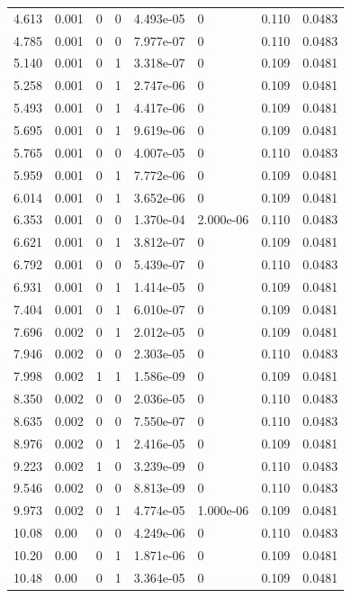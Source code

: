 \documentclass[preview]{standalone}
\begin{document}
{{\begin{tabular}{L{1.2cm}C{1.2cm} C{0.3cm}C{0.5cm} C{1.4cm}C{1.4cm} C{1.4cm}C{1.4cm}}
  4.613  &  0.001  & 0     &  0 &  4.493e-05  & 0  & 0.110 &  0.0483   \\ 
  4.785  &  0.001  & 0     &  0 &  7.977e-07  & 0  & 0.110 &  0.0483   \\ 
  5.140  &  0.001  & 0     &  1 &  3.318e-07  & 0  & 0.109 &  0.0481   \\ 
  5.258  &  0.001  & 0     &  1 &  2.747e-06  & 0  & 0.109 &  0.0481   \\ 
  5.493  &  0.001  & 0     &  1 &  4.417e-06  & 0  & 0.109 &  0.0481   \\ 
  5.695  &  0.001  & 0     &  1 &  9.619e-06  & 0  & 0.109 &  0.0481   \\ 
  5.765  &  0.001  & 0     &  0 &  4.007e-05  & 0  & 0.110 &  0.0483   \\ 
  5.959  &  0.001  & 0     &  1 &  7.772e-06  & 0  & 0.109 &  0.0481   \\ 
  6.014  &  0.001  & 0     &  1 &  3.652e-06  & 0  & 0.109 &  0.0481   \\ 
  6.353  &  0.001  & 0     &  0 &  1.370e-04  & 2.000e-06  & 0.110 &  0.0483   \\ 
  6.621  &  0.001  & 0     &  1 &  3.812e-07  & 0  & 0.109 &  0.0481   \\ 
  6.792  &  0.001  & 0     &  0 &  5.439e-07  & 0  & 0.110 &  0.0483   \\ 
  6.931  &  0.001  & 0     &  1 &  1.414e-05  & 0  & 0.109 &  0.0481   \\ 
  7.404  &  0.001  & 0     &  1 &  6.010e-07  & 0  & 0.109 &  0.0481   \\ 
  7.696  &  0.002  & 0     &  1 &  2.012e-05  & 0  & 0.109 &  0.0481   \\ 
  7.946  &  0.002  & 0     &  0 &  2.303e-05  & 0  & 0.110 &  0.0483   \\ 
  7.998  &  0.002  & 1     &  1 &  1.586e-09  & 0  & 0.109 &  0.0481   \\ 
  8.350  &  0.002  & 0     &  0 &  2.036e-05  & 0  & 0.110 &  0.0483   \\ 
  8.635  &  0.002  & 0     &  0 &  7.550e-07  & 0  & 0.110 &  0.0483   \\ 
  8.976  &  0.002  & 0     &  1 &  2.416e-05  & 0  & 0.109 &  0.0481   \\ 
  9.223  &  0.002  & 1     &  0 &  3.239e-09  & 0  & 0.110 &  0.0483   \\ 
  9.546  &  0.002  & 0     &  0 &  8.813e-09  & 0  & 0.110 &  0.0483   \\ 
  9.973  &  0.002  & 0     &  1 &  4.774e-05  & 1.000e-06  & 0.109 &  0.0481   \\ 
  10.08  &  0.00  & 0     &  0 &  4.249e-06  & 0  & 0.110 &  0.0483   \\ 
  10.20  &  0.00  & 0     &  1 &  1.871e-06  & 0  & 0.109 &  0.0481   \\ 
  10.48  &  0.00  & 0     &  1 &  3.364e-05  & 0  & 0.109 &  0.0481   \\ 
\hline 
\end{tabular} 

}}
\end{document}
